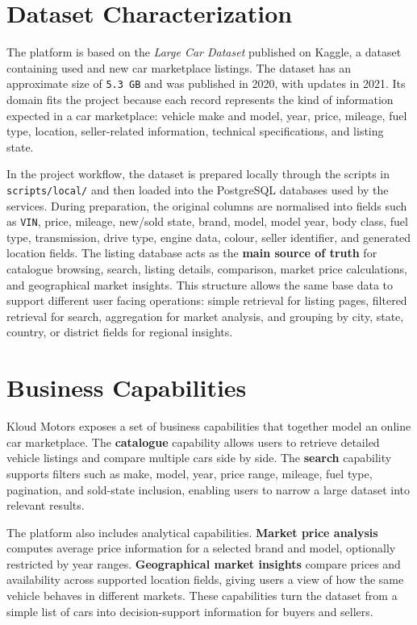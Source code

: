 \section{Dataset Characterization}

The platform is based on the \textit{Large Car Dataset} published on Kaggle, a dataset containing used and new car marketplace listings. The dataset has an approximate size of \texttt{5.3 GB} and was published in 2020, with updates in 2021. Its domain fits the project because each record represents the kind of information expected in a car marketplace: vehicle make and model, year, price, mileage, fuel type, location, seller-related information, technical specifications, and listing state.

In the project workflow, the dataset is prepared locally through the scripts in \texttt{scripts/local/} and then loaded into the PostgreSQL databases used by the services. During preparation, the original columns are normalised into fields such as \texttt{VIN}, price, mileage, new/sold state, brand, model, model year, body class, fuel type, transmission, drive type, engine data, colour, seller identifier, and generated location fields. The listing database acts as the \textbf{main source of truth} for catalogue browsing, search, listing details, comparison, market price calculations, and geographical market insights. This structure allows the same base data to support different user facing operations: simple retrieval for listing pages, filtered retrieval for search, aggregation for market analysis, and grouping by city, state, country, or district fields for regional insights.

\section{Business Capabilities}

Kloud Motors exposes a set of business capabilities that together model an online car marketplace. The \textbf{catalogue} capability allows users to retrieve detailed vehicle listings and compare multiple cars side by side. The \textbf{search} capability supports filters such as make, model, year, price range, mileage, fuel type, pagination, and sold-state inclusion, enabling users to narrow a large dataset into relevant results.

The platform also includes analytical capabilities. \textbf{Market price analysis} computes average price information for a selected brand and model, optionally restricted by year ranges. \textbf{Geographical market insights} compare prices and availability across supported location fields, giving users a view of how the same vehicle behaves in different markets. These capabilities turn the dataset from a simple list of cars into decision-support information for buyers and sellers.


